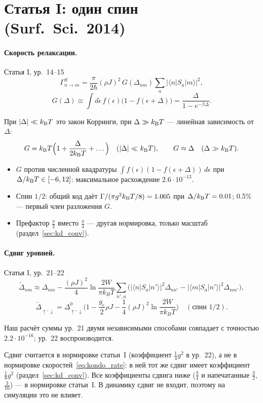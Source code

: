 \section{Статья I: один спин (Surf.\ Sci.\ 2014)}
\label{sec:kondo_ss}

\paragraph{Скорость релаксации.}
\begin{paperbox}{Статья I, ур.~14--15}
\[
\Gamma^S_{n\to m}=\frac{\pi}{2\hbar}(\rho J)^2\,G(\Delta_{nm})\sum_a|\langle n|S_a|m\rangle|^2,
\]
\[
G(\Delta)\equiv\int d\epsilon\,f(\epsilon)\big(1-f(\epsilon+\Delta)\big)=\frac{\Delta}{1-e^{-\beta\Delta}} .
\]
\end{paperbox}
При $|\Delta|\ll k_{\mathrm B}T$ это закон Корринги, при $\Delta\gg k_{\mathrm B}T$ --- линейная зависимость
от $\Delta$:
\[
G=k_{\mathrm B}T\Big(1+\frac{\Delta}{2k_{\mathrm B}T}+\dots\Big)\quad(|\Delta|\ll k_{\mathrm B}T),\qquad G\approx\Delta\quad(\Delta\gg k_{\mathrm B}T).
\]
\begin{cmpbox}
\begin{itemize}
\item $G$ против численной квадратуры $\int f(\epsilon)(1-f(\epsilon+\Delta))\,d\epsilon$ при
  $\Delta/k_{\mathrm B}T\in[-6,12]$: максимальное расхождение $2.6\cdot10^{-13}$.
\item Спин $1/2$: общий код даёт $\Gamma/(\pi g^2k_{\mathrm B}T/8)=1.005$ при $\Delta/k_{\mathrm B}T=0.01$;
  0.5\% --- первый член разложения $G$.
\item Префактор $\tfrac\pi2$ вместо $\tfrac\pi4$ --- другая нормировка, только масштаб
  (раздел~\ref{sec:kd_conv}).
\end{itemize}
\end{cmpbox}

\paragraph{Сдвиг уровней.}
\begin{paperbox}{Статья I, ур.~21--22}
\[
\tilde\Delta_{nm}\approx\Delta_{nm}-\frac{(\rho J)^2}{4}\ln\frac{2W}{\pi k_BT}
\sum_{n',a}\Big(|\langle n|S_a|n'\rangle|^2\Delta_{nn'}-|\langle m|S_a|n'\rangle|^2\Delta_{mn'}\Big),
\]
\[
\tilde\Delta_{\uparrow,\downarrow}=\Delta^0_{\uparrow,\downarrow}\Big(1-\frac{g_e}{2}\rho J-\frac14(\rho J)^2\ln\frac{2W}{\pi k_BT}\Big)
\quad(\text{спин }1/2).
\]
\end{paperbox}
\begin{cmpbox}
Наш расчёт суммы ур.~21 двумя независимыми способами совпадает с точностью
$2.2\cdot10^{-16}$; ур.~22 воспроизводится.
\end{cmpbox}
Сдвиг считается в нормировке статьи~I (коэффициент $\tfrac14g^2$ в ур.~22), а не в
нормировке скоростей~\eqref{eq:kondo_rate}: в ней тот же сдвиг имеет
коэффициент $\tfrac18g^2$ (раздел~\ref{sec:kd_conv}). Все коэффициенты сдвига ниже
($\tfrac34$ и напечатанные $\tfrac32$, $\tfrac3{16}$) --- в нормировке статьи~I. В динамику сдвиг не
входит, поэтому на симуляции это не влияет.

